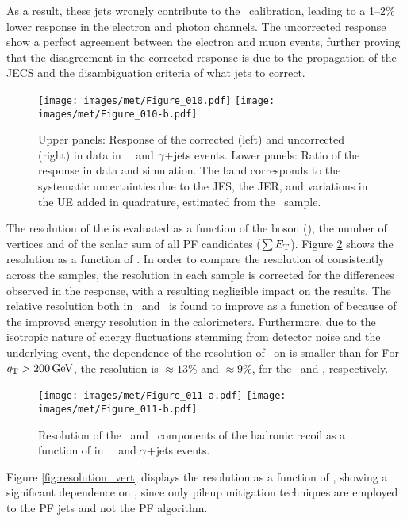 As a result, these jets wrongly contribute to the \ptmiss\ calibration, leading to a 1--2\% lower response in the electron and photon channels. 
The uncorrected \ptmiss response show a perfect agreement between the electron and muon events, further proving that the disagreement in the corrected response is due to the propagation of the JECS and the disambiguation criteria of what jets to correct.
\begin{figure}[htbp!]
  \centering
   \texttt{[image: images/met/Figure\_010.pdf]}
   \texttt{[image: images/met/Figure\_010-b.pdf]}
  \caption{Upper panels: Response of the corrected (left) and uncorrected (right) \ptmiss in data in \Zmm\, \Zee\, and $\gamma+$jets events.  
Lower panels: Ratio of the \ptmiss response in data and simulation. 
The band corresponds to the systematic uncertainties due to the JES, the JER, and variations in the UE added in quadrature, estimated from the \Zee\ sample.}
\label{fig:response}
\end{figure}
\newpara
\noindent\justify
The resolution of the \ptmiss is evaluated as a function of the boson \pt (\qt), the number of vertices and of the scalar \pt sum of all PF candidates ($\sum E_{\mathrm{T}}$).
Figure \ref{fig:resolution_qt} shows the resolution as a function of \qt. 
In order to compare the resolution of \ptmiss consistently across the samples, the resolution in each sample is corrected for the differences observed in the response, with a resulting negligible impact on the results. 
The relative resolution both in \upar\ and \uperp\ is found to improve as a function of \qt because of the improved energy resolution in the calorimeters. 
Furthermore, due to the isotropic nature of energy fluctuations stemming from detector noise and the underlying event, the dependence of the resolution of \uperp\ on \qt is smaller than for \upar\. 
For ${q}_{\mathrm T}>200\,\text{Ge\hspace{-.08em}V}$, the \ptmiss resolution is $\approx 13\%$ and $\approx 9\%$, for the \upar\ and \uperp, respectively.
\begin{figure}[htbp!]
  \centering
   \texttt{[image: images/met/Figure\_011-a.pdf]}
   \texttt{[image: images/met/Figure\_011-b.pdf]}
  \caption{Resolution of the \upar\ and \uperp\ components of the hadronic recoil as a function of \qt in \Zmm\, \Zee\, and $\gamma+$jets events.}
  \label{fig:resolution_qt}
\end{figure}                                                            
\newpara
\noindent\justify
Figure \ref{fig:resolution_vert} displays the resolution as a function of \nvtx, showing a significant dependence on \nvtx, since only pileup mitigation techniques are employed to the PF jets and not the PF \ptmiss algorithm. 

